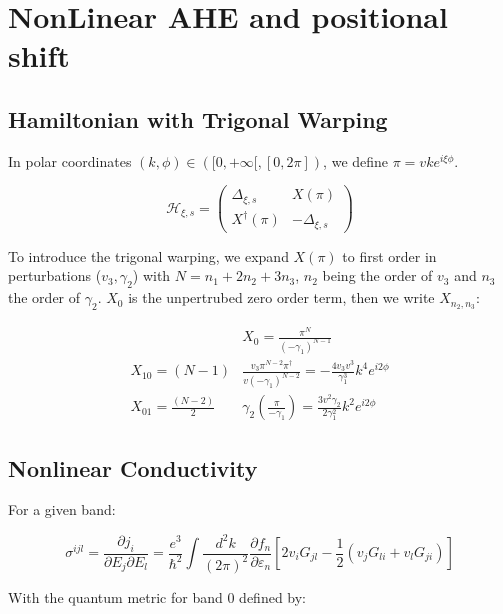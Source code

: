 \documentclass[11pt,a4paper]{report}
\begin{document}
\chapter{NonLinear AHE and positional shift}

\section{Hamiltonian with Trigonal Warping}

In polar coordinates \((k, \phi) \in \left( [0, +\infty[, [0, 2\pi] \right)\), we define \(\pi = vke^{i\xi\phi}\).

\begin{equation}
    \mathcal{H}_{\xi, s} = \begin{pmatrix}
        \Delta_{\xi, s} & X(\pi) \\
        X^{\dagger}(\pi) & -\Delta_{\xi, s}
    \end{pmatrix}
\end{equation}

To introduce the trigonal warping, we expand \(X(\pi)\) to first order in perturbations (\(v_3, \gamma_2\)) with \(N = n_1 + 2n_2 +3n_3\), \(n_2\) being the order of \(v_3\) and \(n_3\) the order of \(\gamma_2\). \(X_0\) is the unpertrubed zero order term, then we write \(X_{n_2, n_3}\):

\begin{align}
    &X_0 = \frac{\pi^N}{(-\gamma_1)^{N-1}}\\
    X_{10} = (N-1)& \frac{v_3 \pi^{N-2} \pi^{\dagger}}{v(-\gamma_1)^{N-2}} = -\frac{4v_3v^3}{\gamma_1^3}k^4e^{i2\phi}\\
    X_{01} = \frac{(N-2)}{2}&\gamma_2 \left(\frac{\pi}{-\gamma_1}\right) = \frac{3v^2\gamma_2}{2\gamma_1^2}k^2e^{i2\phi}
\end{align}

\section{Nonlinear Conductivity}

For a given band:

\begin{equation}
    \sigma^{ijl} = \frac{\partial j_i}{\partial E_j \partial E_l} = \frac{e^3}{\hbar^2} \int \frac{d^2k}{(2\pi)^2} \frac{\partial f_n}{\partial \varepsilon_n} \left[ 2v_i G_{jl} - \frac{1}{2} \left(v_j G_{li} + v_l G_{ji}\right) \right]
\end{equation}

With the quantum metric for band 0 defined by:
\end{document}
